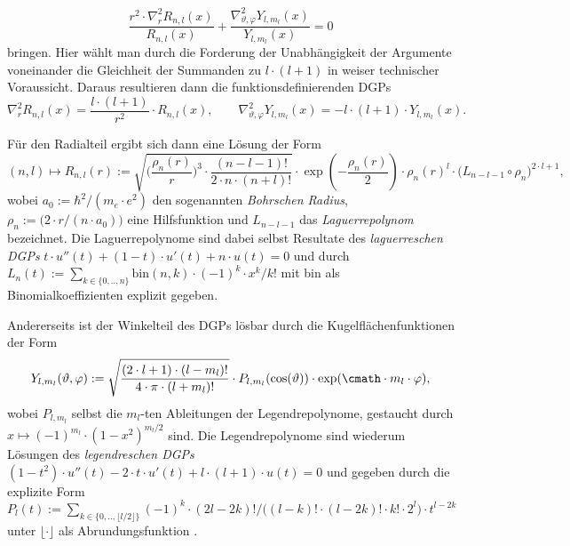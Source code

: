 \documentclass[../main.tex]{subfiles}
\begin{document}
            \[
                \frac{r^2\cdot \nabla^2_r R_{n,l}(x)}{R_{n,l}(x)} + \frac{\nabla^2_{\vartheta,\varphi} Y_{l,m_l}(x)}{Y_{l,m_l}(x)} = 0
            \]
            bringen. Hier wählt man durch die Forderung der Unabhängigkeit der Argumente voneinander die Gleichheit der Summanden zu $l\cdot (l + 1)$ in weiser technischer Voraussicht. Daraus resultieren dann die funktionsdefinierenden DGPs
            \[
                \nabla^2_r R_{n,l}(x) = \frac{l\cdot (l + 1)}{r^2}\cdot R_{n,l}(x),\qquad \nabla^2_{\vartheta,\varphi} Y_{l,m_l}(x) = -l\cdot (l + 1)\cdot Y_{l,m_l}(x).
            \]
            \begin{shaded}
                \noindent Für den Radialteil ergibt sich dann eine Lösung der Form
                \[
                    (n,l)\mapsto R_{n,l}(r) := \sqrt{
                        \biggl(\frac{\rho_n(r)}{r}\biggr)^3\cdot\frac{(n - l - 1)!}{2\cdot n\cdot (n + l)!}
                    }\cdot\exp(-\frac{\rho_n(r)}{2})\cdot\rho_n(r)^l\cdot \bigl(L_{n - l - 1}\circ\rho_n\bigr)^{2\cdot l + 1},
                \]
                wobei $a_0:=\hbar^2/(m_e\cdot e^2)$ den sogenannten \emph{Bohrschen Radius}, $\rho_n:=\bigl(2\cdot r/(n\cdot a_0)\bigr)$ eine Hilfsfunktion und $L_{n - l - 1}$ das \emph{Laguerrepolynom} bezeichnet. Die Laguerrepolynome sind dabei selbst Resultate des \emph{laguerreschen DGPs} $t\cdot u''(t) + (1-t)\cdot u'(t) + n\cdot u(t) = 0$ und durch $L_n(t) := \sum_{k\in\{0,..,n\}}\text{bin}(n,k)\cdot(-1)^k\cdot x^k/k!$ mit bin als Binomialkoeffizienten explizit gegeben. 

                Andererseits ist der Winkelteil des DGPs lösbar durch die Kugelflächenfunktionen der Form
                \[
                    Y_{l,m_l}(\vartheta,\varphi) := \sqrt{\frac{(2\cdot l + 1)\cdot (l - m_l)!}{4\cdot\pi\cdot (l + m_l)!}}\cdot P_{l,m_l}(\cos(\vartheta))\cdot\exp(\cmath\cdot m_l\cdot\varphi),
                \]
                wobei $P_{l,m_l}$ selbst die $m_l$-ten Ableitungen der Legendrepolynome, gestaucht durch $x\mapsto (-1)^{m_l}\cdot(1-x^2)^{{m_l}/2}$ sind. Die Legendrepolynome sind wiederum Lösungen des \emph{legendreschen DGPs} $(1-t^2)\cdot u''(t) - 2\cdot t\cdot u'(t) + l\cdot (l + 1)\cdot u(t) = 0$ und gegeben durch die explizite Form $P_l(t) := \sum_{k\in\{0,..,\lfloor l/2\rfloor\}}(-1)^k\cdot(2l - 2k)!/\bigl((l - k)!\cdot (l - 2k)!\cdot k!\cdot 2^l\bigr)\cdot t^{l-2k}$ unter $\lfloor\cdot\rfloor$ als Abrundungsfunktion \cite{wiki:Laguerrepolynome,wiki:Kugelflaechenfunktionen,wiki:zugeordneteLegendrepolynome,wiki:Legendrepolynome,wiki:BohrRadius,git:IK4T}.
            \end{shaded}
\end{document}
